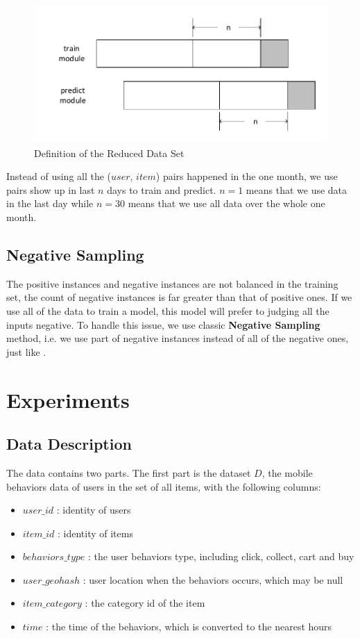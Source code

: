 \documentclass{llncs}
\begin{document}
\begin{figure}[htbp]
	\centering
	\includegraphics[scale=0.6]{images/reduced_data_set.pdf}
	\caption{Definition of the Reduced Data Set}
	\label{fig:reduced_data_set}
\end{figure}

Instead of using all the ($user$, $item$) pairs happened in the one month,
we use pairs show up in last $n$ days to train and predict.
$n = 1$ means that we use data in the last day while
$n = 30$ means that we use all data over the whole one month.

\subsection{Negative Sampling}
The positive instances and negative instances are not balanced in the training set,
the count of negative instances is far greater than that of positive ones.
If we use all of the data to train a model,
this model will prefer to judging all the inputs negative.
To handle this issue, we use classic \textbf{Negative Sampling} method,
i.e. we use part of negative instances instead of all of the negative ones,
just like \cite{Spirydowicz2000Machine}.




\section{Experiments}
\subsection{Data Description}
The data contains two parts.
The first part is the dataset $D$, the mobile behaviors data of users in the set of all items,
with the following columns:
\begin{itemize}
	\item $user\_id$ : identity of users
	\item $item\_id$ : identity of items
	\item $behaviors\_type$ : the user behaviors type, including click, collect, cart and buy
	\item $user\_geohash$ : user location when the behaviors occurs, which may be null
	\item $item\_category$ : the category id of the item
	\item $time$ : the time of the behaviors, which is converted to the nearest hours
\end{itemize}
\end{document}
